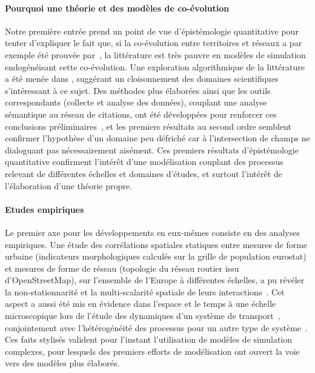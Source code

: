 \paragraph{Pourquoi une théorie et des modèles de co-évolution}


Notre première entrée prend un point de vue d'épistémologie quantitative pour tenter d'expliquer le fait que, si la co-évolution entre territoires et réseaux a par exemple été prouvée par~\cite{bretagnolle:tel-00459720}, la littérature est très pauvre en modèles de simulation endogénéisant cette co-évolution. Une exploration algorithmique de la littérature a été menée dans \cite{raimbault2015models}, suggérant un cloisonnement des domaines scientifiques s'intéressant à ce sujet. Des méthodes plus élaborées ainsi que les outils correspondants (collecte et analyse des données), couplant une analyse sémantique au réseau de citations, ont été développées pour renforcer ces conclusions préliminaires~\cite{raimbault2016indirect}, et les premiers résultats au second ordre semblent confirmer l'hypothèse d'un domaine peu défriché car à l'intersection de champs ne dialoguant pas nécessairement aisément. Ces premiers résultats d'épistémologie quantitative confirment l'intérêt d'une modélisation couplant des processus relevant de différentes échelles et domaines d'études, et surtout l'intérêt de l'élaboration d'une théorie propre.


\paragraph{Etudes empiriques}

Le premier axe pour les développements en eux-mêmes consiste en des analyses empiriques. Une étude des corrélations spatiales statiques entre mesures de forme urbaine (indicateurs morphologiques calculés sur la grille de population eurostat) et mesures de forme de réseau (topologie du réseau routier issu d'OpenStreetMap), sur l'ensemble de l'Europe à différentes échelles, a pu révéler la non-stationnarité et la multi-scalarité spatiale de leurs interactions~\cite{raimbault2016cautious}. Cet aspect a aussi été mis en évidence dans l'espace et le temps à une échelle microscopique lors de l'étude des dynamiques d'un système de transport~\cite{raimbault2017investigating}, conjointement avec l'hétérogénéité des processus pour un autre type de système~\cite{raimbault2015hybrid}. Ces faits stylisés valident pour l'instant l'utilisation de modèles de simulation complexes, pour lesquels des premiers efforts de modélisation ont ouvert la voie vers des modèles plus élaborés.


